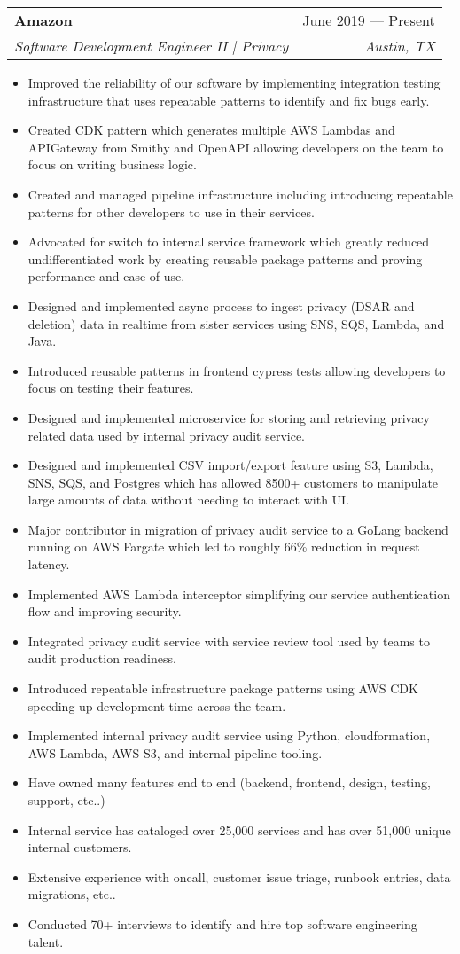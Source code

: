 \documentclass[letterpaper,11pt]{article}
\makeatletter
\newcommand{\resumeItem}[1]{
  \item\small{
    {#1 \vspace{-2pt}}
  }
}
\newcommand{\resumeSubheading}[4]{
  \vspace{-2pt}\item
    \begin{tabular*}{0.97\textwidth}[t]{l@{\extracolsep{\fill}}r}
      \textbf{#1} & #2 \\
      \textit{\small#3} & \textit{\small #4} \\
    \end{tabular*}\vspace{-7pt}
}
\newcommand{\resumeItemListStart}{\begin{itemize}}
\newcommand{\resumeItemListEnd}{\end{itemize}\vspace{-5pt}}
\makeatother
\begin{document}
    \resumeSubheading{Amazon}{June 2019 --- Present}{Software Development Engineer II | Privacy}{Austin, TX}
      \resumeItemListStart{}
        \resumeItem{Improved the reliability of our software by implementing integration testing infrastructure that uses repeatable patterns to identify and fix bugs early.}
        \resumeItem{Created CDK pattern which generates multiple AWS Lambdas and APIGateway from Smithy and OpenAPI allowing developers on the team to focus on writing business logic.}
        \resumeItem{Created and managed pipeline infrastructure including introducing repeatable patterns for other developers to use in their services.}
        \resumeItem{Advocated for switch to internal service framework which greatly reduced undifferentiated work by creating reusable package patterns and proving performance and ease of use.}
        \resumeItem{Designed and implemented async process to ingest privacy (DSAR and deletion) data in realtime from sister services using SNS, SQS, Lambda, and Java.}
        \resumeItem{Introduced reusable patterns in frontend cypress tests allowing developers to focus on testing their features.}
        \resumeItem{Designed and implemented microservice for storing and retrieving privacy related data used by internal privacy audit service.}
        \resumeItem{Designed and implemented CSV import/export feature using S3, Lambda, SNS, SQS, and Postgres which has allowed 8500+ customers to manipulate large amounts of data without needing to interact with UI.}
        \resumeItem{Major contributor in migration of privacy audit service to a GoLang backend running on AWS Fargate which led to roughly 66\% reduction in request latency.}
        \resumeItem{Implemented AWS Lambda interceptor simplifying our service authentication flow and improving security.}
        \resumeItem{Integrated privacy audit service with service review tool used by teams to audit production readiness.}
        \resumeItem{Introduced repeatable infrastructure package patterns using AWS CDK speeding up development time across the team.}
        \resumeItem{Implemented internal privacy audit service using Python, cloudformation, AWS Lambda, AWS S3, and internal pipeline tooling.}
        \resumeItem{Have owned many features end to end (backend, frontend, design, testing, support, etc..)}
        \resumeItem{Internal service has cataloged over 25,000 services and has over 51,000 unique internal customers.}
        \resumeItem{Extensive experience with oncall, customer issue triage, runbook entries, data migrations, etc..}
        \resumeItem{Conducted 70+ interviews to identify and hire top software engineering talent.}
      \resumeItemListEnd{}
      
\end{document}
